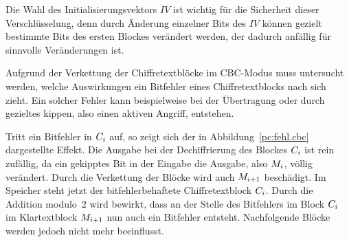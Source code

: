 Die Wahl des Initialisierungsvektors $IV$ ist wichtig für die Sicherheit dieser Verschlüsselung, denn durch Änderung einzelner Bits des $IV$ können gezielt
bestimmte Bits des ersten Blockes verändert werden, der dadurch anfällig für sinnvolle Veränderungen ist.

Aufgrund der Verkettung der Chiffretextblöcke im CBC-Modus muss untersucht werden, welche Auswirkungen ein Bitfehler eines Chiffretextblocks nach sich zieht.
Ein solcher Fehler kann beispielweise bei der Übertragung oder durch gezieltes kippen, also einen aktiven Angriff, entstehen.

Tritt ein Bitfehler in $C_i$ auf, so zeigt sich der in Abbildung~\ref{pc:fehl.cbc} dargestellte Effekt. Die Ausgabe bei der Dechiffrierung des Blockes $C_i$
ist rein zufällig, da ein gekipptes Bit in der Eingabe die Ausgabe, also $M_i$, völlig verändert.
Durch die Verkettung der Blöcke wird auch $M_{i+1}$ beschädigt. Im Speicher steht jetzt der bitfehlerbehaftete Chiffretextblock $C_i$.
Durch die Addition modulo~2  wird bewirkt, dass an der Stelle des Bitfehlers im Block $C_i$ im Klartextblock $M_{i+1}$ nun auch ein Bitfehler entsteht. 
Nachfolgende Blöcke werden jedoch nicht mehr beeinflusst.
